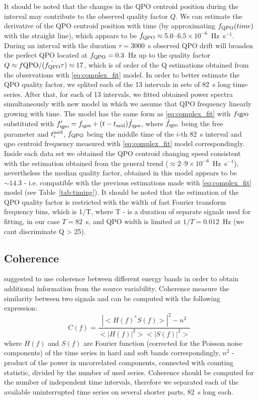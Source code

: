 \documentclass[a4paper,fleqn,usenatbib]{mnras}
\begin{document}
It should be noted that the changes in the QPO centroid position during the interval may contribute to the observed quality factor $Q$.
We can estimate the derivative of the QPO centroid position with time (by approximating $f_{\rm QPO}(time)$ with the straight line), which appears to be $\dot{f}_{\rm QPO} \approx 5.0$--$6.5\times10^{-6}$~Hz~s$^{-1}$. 
During an interval with the duration $\tau = 3000$~s observed QPO drift will broaden the perfect QPO located at $f_{\rm QPO}=0.3$~Hz up to the quality factor $Q \approx f{\rm QPO}/(\dot{f_{\rm QPO}}\tau) \approx 17$, which is of order of the Q estimations obtained from the observations with \ref{eq:complex_fit} model.
In order to better estimate the QPO quality factor, we splited each of the 13 intervals in sets of 82~s long time-series. 
After that, for each of 13 intervals, we fitted obtained power spectra simultaneously with new model in which we assume that QPO frequency linearly growing with time. 
The model has the same form as \ref{eq:complex_fit} with $f{\rm qpo}$ substituted with $f_{\rm qpo}' = f_{\rm qpo} + (t - t_{\rm mid})\dot{f}_{\rm qpo}$, where $\dot{f}_{\rm qpo}$ being the free parameter and $t_{i}^{\rm mid}$, $f_{\rm QPO}$ being the middle time of the $i$-th 82~s interval and qpo centroid frequency measured with \ref{eq:complex_fit} model correspondingly.
Inside each data set we obtained the QPO centroid changing speed consistent with the estimation obtained from the general trend ($\approx 2$--$9\times10^{-6}$~Hz~s$^{-1}$), nevertheless the median quality factor, obtained in this model appears to be $\sim14.3$ - i.e. compatible with the previous estimations made with \ref{eq:complex_fit} model (see Table~\ref{tab:timing}). 
It should be noted that the estimation of the QPO quality factor is restricted with the width of fast Fourier transform frequency bins, which is 1/T, where T - is a duration of separate signals used for fitting, in our case $T=82$~s, and QPO width is limited at $1/T = 0.012$~Hz (we cant discriminate Q > 25).


\subsection{Coherence}

\citep{1997ApJ...474L..43V} suggested to use coherence between different energy bands in order to obtain additional information from the source variability. 
Coherence measure the similarity between two signals and can be computed with the following expression:
\begin{equation}
    C(f) = \frac{|<H(f)^*S(f)>|^2 - n^2}{<|H(f)|^2><|S(f)|^2>}
    \label{eq:nowak_coh}
\end{equation}
where $H(f)$ and $S(f)$ are Fourier function (corrected for the Poisson noise components) of the time series in hard and soft bands correspondingly, 
$n^2$ - product of the power in uncorrelated components, connected with counting statistic, divided by the number of used series. 
Coherence should be computed for the number of independent time intervals, therefore we separated each of the available uninterrupted time series on several shorter parts, 82~s long each.  
\end{document}
